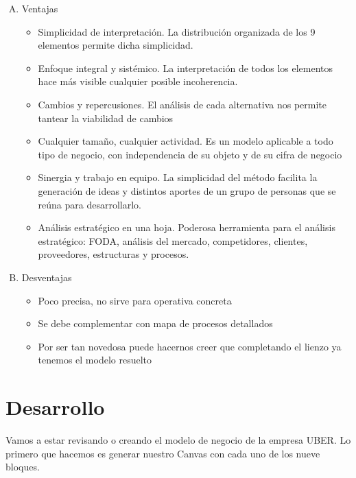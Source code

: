 \documentclass[10pt,a4paper]{article}
\begin{document}
\begin{multicols}{2}
		\begin{enumerate}[A.]
			\item Ventajas
				\begin{itemize}
					\item Simplicidad de interpretación. La distribución organizada de los 9 elementos permite dicha simplicidad. 
					\item Enfoque integral y sistémico. La interpretación de todos los elementos hace más visible cualquier posible incoherencia. 
					\item Cambios y repercusiones. El análisis de cada alternativa nos permite tantear la viabilidad de cambios
					\item Cualquier tamaño, cualquier actividad. Es un modelo aplicable a todo tipo de negocio, con independencia de su objeto y de su cifra de negocio
					\item Sinergia y trabajo en equipo. La simplicidad del método facilita la generación de ideas y distintos aportes de un grupo de personas que se reúna para desarrollarlo. 
					\item Análisis estratégico en una hoja. Poderosa herramienta para el análisis estratégico: FODA, análisis del mercado, competidores, clientes, proveedores, estructuras y procesos. 
				\end{itemize}
			
			\item Desventajas
				\begin{itemize}
					\item Poco precisa, no sirve para operativa concreta
					\item Se debe complementar con mapa de procesos detallados
					\item Por ser tan novedosa puede hacernos creer que completando el lienzo ya tenemos el modelo resuelto
				\end{itemize}
		\end{enumerate}	
		
		\section{Desarrollo}
		
		Vamos a estar revisando o creando el modelo de negocio de la empresa UBER. 		
		Lo primero que hacemos es generar nuestro Canvas con cada uno de los nueve bloques.\\
					

\end{multicols}
\end{document}
